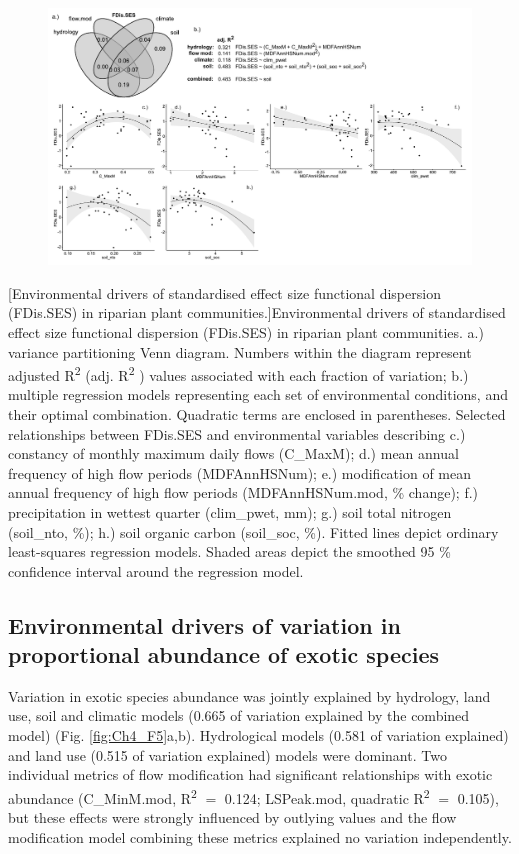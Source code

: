 \documentclass[openright,12pt,a4paper]{memoir}
\begin{document}
\begin{landscape}
\begin{figure}[ht]
\centering
\includegraphics[height = \textheight]{Ch4FDisSES.pdf} %
\end{figure}
\clearpage %
\end{landscape}
\begingroup
{}[Environmental drivers of standardised effect size functional dispersion (FDis.SES) in riparian plant communities.]{\small{Environmental drivers of standardised effect size functional dispersion (FDis.SES) in riparian plant communities. a.) variance partitioning Venn diagram. Numbers within the diagram represent adjusted R\textsuperscript{2}  (adj. R\textsuperscript{2} ) values associated with each fraction of variation; b.) multiple regression models representing each set of environmental conditions, and their optimal combination. Quadratic terms are enclosed in parentheses. Selected relationships between FDis.SES and environmental variables describing c.) constancy of monthly maximum daily flows (C\_MaxM); d.) mean annual frequency of high flow periods (MDFAnnHSNum); e.) modification of mean annual frequency of high flow periods (MDFAnnHSNum.mod, \% change); f.) precipitation in wettest quarter (clim\_pwet, mm); g.) soil total nitrogen (soil\_nto, \%); h.) soil organic carbon (soil\_soc, \%). Fitted lines depict ordinary least-squares regression models. Shaded areas depict the smoothed 95 \% confidence interval around the regression model.}}
\label{fig:Ch4_F4} %
\endgroup
\clearpage

\subsection{Environmental drivers of variation in proportional abundance of exotic species}
Variation in exotic species abundance was jointly explained by hydrology, land use, soil and climatic models (0.665 of variation explained by the combined model) (Fig. \ref{fig:Ch4_F5}a,b). Hydrological models (0.581 of variation explained) and land use (0.515 of variation explained) models were dominant. Two individual metrics of flow modification had significant relationships with exotic abundance (C\_MinM.mod, R\textsuperscript{2}  $=$ 0.124; LSPeak.mod, quadratic R\textsuperscript{2}  $=$ 0.105), but these effects were strongly influenced by outlying values and the flow modification model combining these metrics explained no variation independently.
\end{document}

